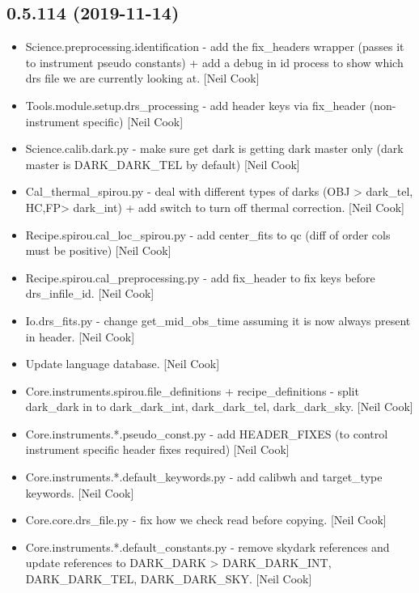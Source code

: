 \documentclass[a4paper,10pt,english]{report}
\begin{document}
\subsection{0.5.114 (2019-11-14)}
\label{\detokenize{misc/changelog:id27}}\begin{itemize}
\item {} 
Science.preprocessing.identification - add the fix\_headers wrapper
(passes it to instrument pseudo constants) + add a debug in id process
to show which drs file we are currently looking at. {[}Neil Cook{]}

\item {} 
Tools.module.setup.drs\_processing - add header keys via fix\_header
(non-instrument specific) {[}Neil Cook{]}

\item {} 
Science.calib.dark.py - make sure get dark is getting dark master only
(dark master is DARK\_DARK\_TEL by default) {[}Neil Cook{]}

\item {} 
Cal\_thermal\_spirou.py - deal with different types of darks (OBJ \textendash{}\textgreater{}
dark\_tel, HC,FP\textendash{}\textgreater{} dark\_int) + add switch to turn off thermal
correction. {[}Neil Cook{]}

\item {} 
Recipe.spirou.cal\_loc\_spirou.py - add center\_fits to qc (diff of order
cols must be positive) {[}Neil Cook{]}

\item {} 
Recipe.spirou.cal\_preprocessing.py - add fix\_header to fix keys before
drs\_infile\_id. {[}Neil Cook{]}

\item {} 
Io.drs\_fits.py - change get\_mid\_obs\_time assuming it is now always
present in header. {[}Neil Cook{]}

\item {} 
Update language database. {[}Neil Cook{]}

\item {} 
Core.instruments.spirou.file\_definitions + recipe\_definitions - split
dark\_dark in to dark\_dark\_int, dark\_dark\_tel, dark\_dark\_sky. {[}Neil
Cook{]}

\item {} 
Core.instruments.*.pseudo\_const.py - add HEADER\_FIXES (to control
instrument specific header fixes required) {[}Neil Cook{]}

\item {} 
Core.instruments.*.default\_keywords.py - add calibwh and target\_type
keywords. {[}Neil Cook{]}

\item {} 
Core.core.drs\_file.py - fix how we check read before copying. {[}Neil
Cook{]}

\item {} 
Core.instruments.*.default\_constants.py - remove skydark references
and update references to DARK\_DARK \textendash{}\textgreater{} DARK\_DARK\_INT, DARK\_DARK\_TEL,
DARK\_DARK\_SKY. {[}Neil Cook{]}

\end{itemize}
\end{document}
